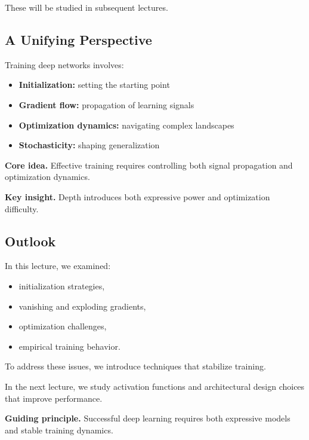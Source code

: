 \noindent
These will be studied in subsequent lectures.

\subsection{A Unifying Perspective}

Training deep networks involves:

\begin{itemize}
    \item \textbf{Initialization:} setting the starting point
    \item \textbf{Gradient flow:} propagation of learning signals
    \item \textbf{Optimization dynamics:} navigating complex landscapes
    \item \textbf{Stochasticity:} shaping generalization
\end{itemize}

\medskip

\noindent
\textbf{Core idea.}  
Effective training requires controlling both signal propagation and optimization dynamics.

\medskip

\noindent
\textbf{Key insight.}  
Depth introduces both expressive power and optimization difficulty.

\subsection{Outlook}

In this lecture, we examined:

\begin{itemize}
    \item initialization strategies,
    \item vanishing and exploding gradients,
    \item optimization challenges,
    \item empirical training behavior.
\end{itemize}

\medskip

\noindent
To address these issues, we introduce techniques that stabilize training.

\medskip

\noindent
In the next lecture, we study activation functions and architectural design choices that improve performance.

\medskip

\noindent
\textbf{Guiding principle.}  
Successful deep learning requires both expressive models and stable training dynamics.